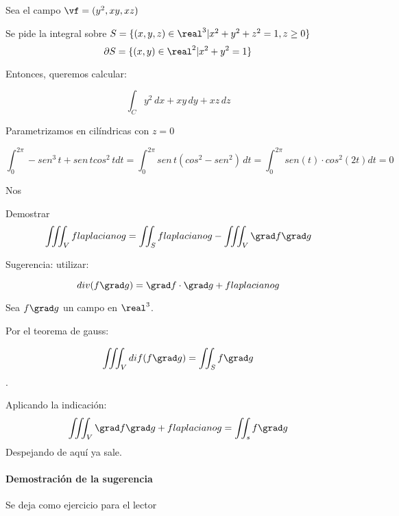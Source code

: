 \begin{problem}[20]
Sea el campo $\vf = (y^2,xy,xz)$

Se pide la integral sobre $S= \{(x,y,z)\in \real^3 | x^2+y^2+z^2=1, z\ge 0\}$
\solution
\[\partial S = \{(x,y)\in\real^2|x^2+y^2=1\}\]

Entonces, queremos calcular:

\[\int_C y^2\,dx + xy\,dy + xz\,dz\]

Parametrizamos en cilíndricas con $z=0$

\[\int_0^{2\pi} -sen^3\,t + sen\,tcos^2\,t dt = \int_0^{2\pi} sen\,t(cos^2-sen^2)\,dt = \int_0^{2\pi} sen(t)\cdot cos^2(2t)dt = 0\]

Nos

\end{problem}

\begin{problem}[29]
Demostrar
\[\iiint_V f laplaciano g = \iint_S f laplaciano g - \iiint_V \grad f \grad g\]

Sugerencia: utilizar:

\[div(f\grad g) =\grad f \cdot \grad g + f laplaciano g\]
\solution

Sea $f\grad g$ un campo en $\real^3$.

Por el teorema de gauss:

\[\iiint_V dif(f\grad g) = \iint_S f\grad g\].


Aplicando la indicación:
\[\iiint_V \grad f \grad g + f laplaciano g = \iint_s f \grad g\]
Despejando de aquí ya sale.

\paragraph{Demostración de la sugerencia}

Se deja como ejercicio para el lector
\end{problem}

